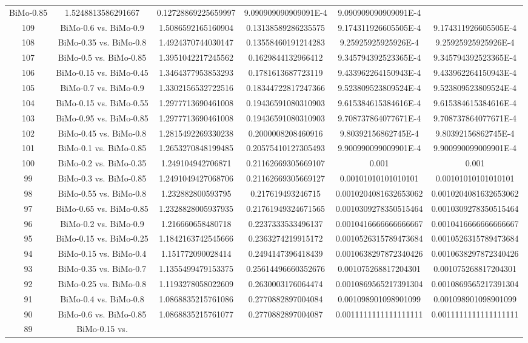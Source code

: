 \documentclass[a4paper,10pt]{article}
\begin{document}
\begin{landscape}
\begin{table}[!htp]
\begin{tabular}{cccccc}
BiMo-0.85&1.5248813586291667&0.12728869225659997&9.090909090909091E-4&9.090909090909091E-4\\109&BiMo-0.6 vs. BiMo-0.9&1.5086592165160904&0.13138589286235575&9.174311926605505E-4&9.174311926605505E-4\\108&BiMo-0.35 vs. BiMo-0.8&1.4924370744030147&0.13558460191214283&9.25925925925926E-4&9.25925925925926E-4\\107&BiMo-0.5 vs. BiMo-0.85&1.3951042217245562&0.1629844132966412&9.345794392523365E-4&9.345794392523365E-4\\106&BiMo-0.15 vs. BiMo-0.45&1.3464377953853293&0.1781613687723119&9.433962264150943E-4&9.433962264150943E-4\\105&BiMo-0.7 vs. BiMo-0.9&1.3302156532722516&0.18344722817247366&9.523809523809524E-4&9.523809523809524E-4\\104&BiMo-0.15 vs. BiMo-0.55&1.2977713690461008&0.19436591080310903&9.615384615384616E-4&9.615384615384616E-4\\103&BiMo-0.95 vs. BiMo-0.85&1.2977713690461008&0.19436591080310903&9.708737864077671E-4&9.708737864077671E-4\\102&BiMo-0.45 vs. BiMo-0.8&1.2815492269330238&0.2000008208460916&9.80392156862745E-4&9.80392156862745E-4\\101&BiMo-0.1 vs. BiMo-0.85&1.2653270848199485&0.20575410127305493&9.900990099009901E-4&9.900990099009901E-4\\100&BiMo-0.2 vs. BiMo-0.35&1.249104942706871&0.21162669305669107&0.001&0.001\\99&BiMo-0.3 vs. BiMo-0.85&1.2491049427068706&0.21162669305669127&0.00101010101010101&0.00101010101010101\\98&BiMo-0.55 vs. BiMo-0.8&1.232882800593795&0.217619493246715&0.0010204081632653062&0.0010204081632653062\\97&BiMo-0.65 vs. BiMo-0.85&1.2328828005937935&0.21761949324671565&0.0010309278350515464&0.0010309278350515464\\96&BiMo-0.2 vs. BiMo-0.9&1.216660658480718&0.2237333533496137&0.0010416666666666667&0.0010416666666666667\\95&BiMo-0.15 vs. BiMo-0.25&1.1842163742545666&0.2363274219915172&0.0010526315789473684&0.0010526315789473684\\94&BiMo-0.15 vs. BiMo-0.4&1.151772090028414&0.2494147396418439&0.0010638297872340426&0.0010638297872340426\\93&BiMo-0.35 vs. BiMo-0.7&1.1355499479153375&0.25614496660352676&0.001075268817204301&0.001075268817204301\\92&BiMo-0.25 vs. BiMo-0.8&1.1193278058022609&0.2630003176064474&0.0010869565217391304&0.0010869565217391304\\91&BiMo-0.4 vs. BiMo-0.8&1.0868835215761086&0.2770882897004084&0.001098901098901099&0.001098901098901099\\90&BiMo-0.6 vs. BiMo-0.85&1.0868835215761077&0.2770882897004087&0.0011111111111111111&0.0011111111111111111\\89&BiMo-0.15 vs. 
\end{tabular}
\end{table}
\end{landscape}
\end{document}

